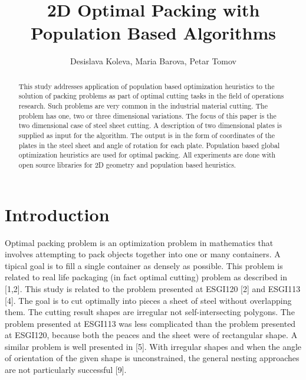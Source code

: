\documentclass{llncs}
\begin{document}
\pagestyle{headings} 
\mainmatter
%
\title{2D Optimal Packing with Population Based Algorithms}
%
\author{Desislava Koleva, Maria Barova, Petar Tomov}
%
%
%
%
%
\maketitle
%
\begin{abstract}
This study addresses application of population based optimization heuristics to the solution of packing problems as part of optimal cutting tasks in the field of operations research. Such problems are very common in the industrial material cutting. The problem has one, two or three dimensional variations. The focus of this paper is the two dimensional case of steel sheet cutting. A description of two dimensional plates is supplied as input for the algorithm. The output is in the form of coordinates of the plates in the steel sheet and angle of rotation for each plate. Population based global optimization heuristics are used for optimal packing. All experiments are done with open source libraries for 2D geometry and population based heuristics. 
\end{abstract}
%
\section{Introduction}
%
Optimal packing problem is an optimization problem in mathematics that involves attempting to pack objects together into one or many containers. A tipical goal is to fill a single container as densely as possible. This problem is related to real life packaging (in fact optimal cutting) problem as described in [1,2]. This study is related to the problem presented at ESGI120 [2] and ESGI113 [4]. The goal is to cut optimally into pieces a sheet of steel without overlapping them. The cutting result shapes are irregular not self-intersecting polygons. The problem presented at ESGI113 was less complicated than the problem presented at ESGI120, because both the peaces and the sheet were of rectangular shape. A similar problem is well presented in [5]. With irregular shapes and when the angle of orientation of the given shape is unconstrained, the general nesting approaches are not particularly successful [9]. 
\end{document}
